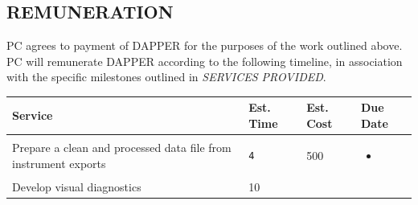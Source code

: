 \documentclass[
  11pt,
]{article}
\begin{document}
\hypertarget{remuneration}{%
\subsection{REMUNERATION}\label{remuneration}}

PC agrees to payment of DAPPER for the purposes of the work outlined
above. PC will remunerate DAPPER according to the following timeline, in
association with the specific milestones outlined in \emph{SERVICES
PROVIDED}.

\newpage

\begin{longtable}[]{@{}llll@{}}
\toprule
\begin{minipage}[b]{0.45\columnwidth}\raggedright
Service\strut
\end{minipage} & \begin{minipage}[b]{0.15\columnwidth}\raggedright
Est. Time\strut
\end{minipage} & \begin{minipage}[b]{0.15\columnwidth}\raggedright
Est. Cost\strut
\end{minipage} & \begin{minipage}[b]{0.15\columnwidth}\raggedright
Due Date\strut
\end{minipage}\tabularnewline
\midrule
\endhead
\begin{minipage}[t]{0.45\columnwidth}\raggedright
Prepare a clean and processed data file from instrument exports\strut
\end{minipage} & \begin{minipage}[t]{0.15\columnwidth}\raggedright
\begin{verbatim}
4
\end{verbatim}
\strut
\end{minipage} & \begin{minipage}[t]{0.15\columnwidth}\raggedright
500\strut
\end{minipage} & \begin{minipage}[t]{0.15\columnwidth}\raggedright
\begin{itemize}
\item
\end{itemize}\strut
\end{minipage}\tabularnewline
\begin{minipage}[t]{0.45\columnwidth}\raggedright
Develop visual diagnostics\strut
\end{minipage} & \begin{minipage}[t]{0.15\columnwidth}\raggedright
10\strut
\end{minipage} & \begin{minipage}[t]{0.15\columnwidth}\raggedright

\end{minipage}
\end{longtable}
\end{document}
